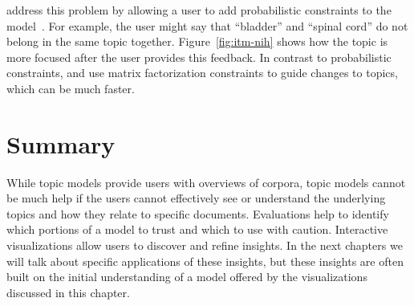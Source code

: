 \citet{hu-14:itm} address this problem by allowing a user to add probabilistic
constraints to the model~\citep{boyd-graber-07,andrzejewski-09}.  For example,
the user might say that ``bladder'' and ``spinal cord'' do not belong in the same
topic together.  Figure~\ref{fig:itm-nih} shows how the topic is more focused after the
user provides this feedback.  In contrast to probabilistic constraints,
\citet{choo-13} and \citet{lund-17} use matrix factorization constraints to guide changes
to topics, which can be much faster.

\section{Summary}

While topic models provide users with overviews of corpora, topic models
cannot be much help if the users cannot effectively see or understand
the underlying topics and how they relate to specific documents.
Evaluations help to identify which portions of a model to trust and which to use with caution.
Interactive visualizations allow users to discover and
refine insights. In the next chapters we will talk about specific applications of
these insights, but these insights are often built on the initial understanding
of a model offered by the visualizations discussed in this chapter.
